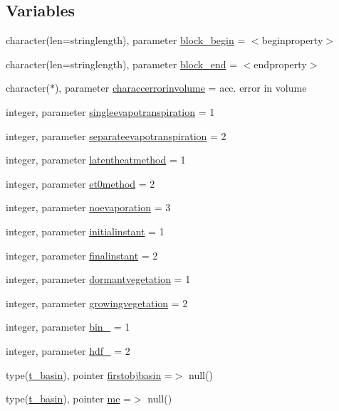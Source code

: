 \subsection*{Variables}
\begin{DoxyCompactItemize}
\item 
character(len=stringlength), parameter \mbox{\hyperlink{namespacemodulebasin_a14ea3de5b477aa2d46ac8ce040ba891c}{block\+\_\+begin}} = \textquotesingle{}$<$beginproperty$>$\textquotesingle{}
\item 
character(len=stringlength), parameter \mbox{\hyperlink{namespacemodulebasin_a2dc5a4aaf15a73086781f37d625f774d}{block\+\_\+end}} = \textquotesingle{}$<$endproperty$>$\textquotesingle{}
\item 
character($\ast$), parameter \mbox{\hyperlink{namespacemodulebasin_a230ea75f89c595973578b0499383801d}{characcerrorinvolume}} = \textquotesingle{}acc. error in volume\textquotesingle{}
\item 
integer, parameter \mbox{\hyperlink{namespacemodulebasin_a2dcbd4e7d257d1f941396190dc70d0ff}{singleevapotranspiration}} = 1
\item 
integer, parameter \mbox{\hyperlink{namespacemodulebasin_a4b6df4471c430f67f989fae81f10890e}{separateevapotranspiration}} = 2
\item 
integer, parameter \mbox{\hyperlink{namespacemodulebasin_aa7e35827b82168f13e8ecdcc1bf6617f}{latentheatmethod}} = 1
\item 
integer, parameter \mbox{\hyperlink{namespacemodulebasin_a173aa2ad8e4e632e6cb9251e98c97e5d}{et0method}} = 2
\item 
integer, parameter \mbox{\hyperlink{namespacemodulebasin_af088e3a549c4287fe37268c7b797009a}{noevaporation}} = 3
\item 
integer, parameter \mbox{\hyperlink{namespacemodulebasin_a08406908915d785e95593b3fac62eba2}{initialinstant}} = 1
\item 
integer, parameter \mbox{\hyperlink{namespacemodulebasin_ab601fa0c07f0bc9134f81f45d1341678}{finalinstant}} = 2
\item 
integer, parameter \mbox{\hyperlink{namespacemodulebasin_a07f6f68a43c452ae9eef45c1933a1d20}{dormantvegetation}} = 1
\item 
integer, parameter \mbox{\hyperlink{namespacemodulebasin_a2def264a3397d7af9334938fcadc85a1}{growingvegetation}} = 2
\item 
integer, parameter \mbox{\hyperlink{namespacemodulebasin_ab9e149429872bd1ef4a8213cff258870}{bin\+\_\+}} = 1
\item 
integer, parameter \mbox{\hyperlink{namespacemodulebasin_adfc7cbd6f69b8542c190e4a6c26df03d}{hdf\+\_\+}} = 2
\item 
type(\mbox{\hyperlink{structmodulebasin_1_1t__basin}{t\+\_\+basin}}), pointer \mbox{\hyperlink{namespacemodulebasin_a5b7e2b3f3d81ecb78131059c79f1557e}{firstobjbasin}} =$>$ null()
\item 
type(\mbox{\hyperlink{structmodulebasin_1_1t__basin}{t\+\_\+basin}}), pointer \mbox{\hyperlink{namespacemodulebasin_ac2c2d1c0a2e6ccb0d5e821368192a807}{me}} =$>$ null()
\end{DoxyCompactItemize}


